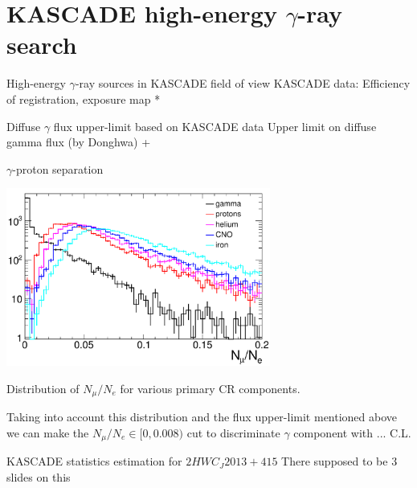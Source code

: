 
\section{KASCADE high-energy \texorpdfstring{$\gamma$}{gamma}-ray search}

\begin{frame}{High-energy $\gamma$-ray sources in KASCADE field of view}
  KASCADE data: Efficiency of registration, exposure map *
\end{frame}

\begin{frame}{Diffuse $\gamma$ flux upper-limit based on KASCADE data}
  Upper limit on diffuse gamma flux (by Donghwa) +
\end{frame}

\begin{frame}{$\gamma$-proton separation}
\small
\vspace{-1em}
\begin{center}
    \includegraphics[width=0.65\textwidth]{pics/Nmu_Ne.pdf}
    
    Distribution of $N_\mu / N_e$ for various primary CR components.
\end{center}
Taking into account this distribution and the flux upper-limit mentioned above we can make the 
$N_\mu/N_e \in [0, 0.008)$ cut to discriminate $\gamma$ component with ... C.L.
\end{frame}

\begin{frame}{KASCADE statistics estimation for $2HWC_J2013+415$}
There supposed to be 3 slides on this
\end{frame}
